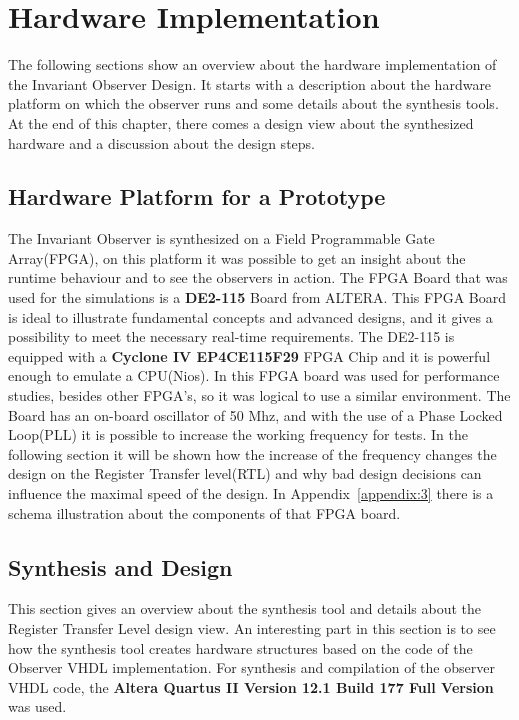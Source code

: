 \chapter{Hardware Implementation}

\ifpdf
    \graphicspath{{Chapter3/Figs/Raster/}{Chapter3/Figs/PDF/}{Chapter3/Figs/}}
\else
    \graphicspath{{Chapter3/Figs/Vector/}{Chapter3/Figs/}}
\fi


The following sections show an overview about the hardware implementation of the Invariant Observer Design. 
It starts with a description about the hardware platform on which the observer runs and some details
about the synthesis tools. 
At the end of this chapter, there comes a design view about the synthesized hardware and a discussion about 
the design steps. 
\section{Hardware Platform for a Prototype}
The Invariant Observer is synthesized on a Field Programmable Gate Array(FPGA), on this platform it was possible to get an insight
about the runtime behaviour and to see the observers in action. 
The FPGA Board that was used for the simulations is a \textbf{DE2-115} Board from ALTERA\cite{altera1}. 
This FPGA Board is ideal to illustrate fundamental concepts and advanced designs, and it gives a possibility
to meet the necessary real-time requirements. The DE2-115 is equipped with a \textbf{Cyclone IV EP4CE115F29} 
FPGA Chip and it is powerful enough to emulate a CPU(Nios). In \cite{RTFMBJ13} this FPGA board was used for performance studies, besides other FPGA's,
so it was logical to use a similar environment. 
The Board has an on-board oscillator of 50 Mhz, and with the use of a Phase Locked Loop(PLL) it is possible to increase the working frequency for tests. 
In the following section it will be shown how the increase of the frequency changes the design on the Register Transfer level(RTL) and why bad design decisions 
can influence the maximal speed of the design. In Appendix~\ref{appendix:3} there is a schema illustration about the components of that FPGA board. 


\section{Synthesis and Design}
This section gives an overview about the synthesis tool and details about the Register Transfer Level design view. 
An interesting part in this section is to see how the synthesis tool creates hardware structures based on the code of the
Observer VHDL implementation. \newline
For synthesis and compilation of the observer VHDL code, the \textbf{Altera Quartus II Version 12.1 Build 177 Full Version} was used. 
